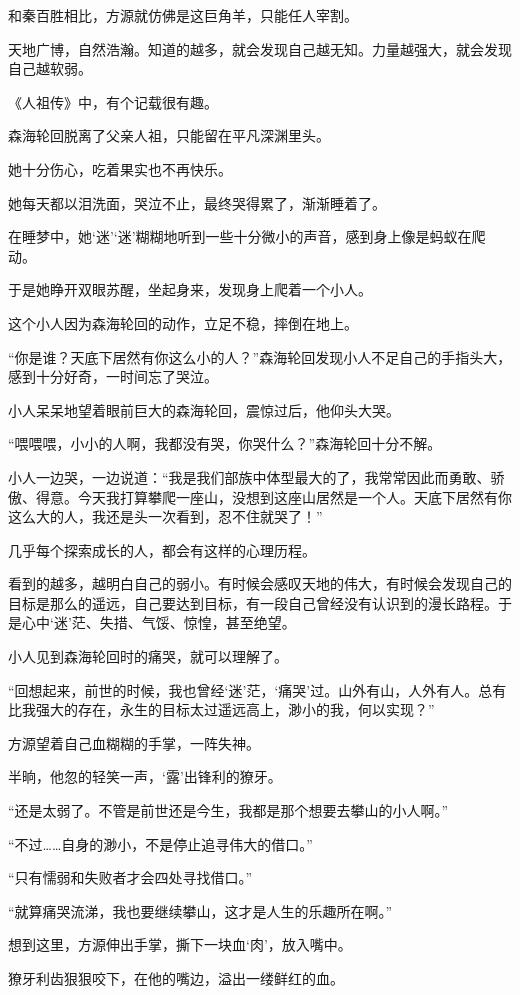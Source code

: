 \begin{this_body}
和秦百胜相比，方源就仿佛是这巨角羊，只能任人宰割。

天地广博，自然浩瀚。知道的越多，就会发现自己越无知。力量越强大，就会发现自己越软弱。

《人祖传》中，有个记载很有趣。

森海轮回脱离了父亲人祖，只能留在平凡深渊里头。

她十分伤心，吃着果实也不再快乐。

她每天都以泪洗面，哭泣不止，最终哭得累了，渐渐睡着了。

在睡梦中，她‘迷’‘迷’糊糊地听到一些十分微小的声音，感到身上像是蚂蚁在爬动。

于是她睁开双眼苏醒，坐起身来，发现身上爬着一个小人。

这个小人因为森海轮回的动作，立足不稳，摔倒在地上。

“你是谁？天底下居然有你这么小的人？”森海轮回发现小人不足自己的手指头大，感到十分好奇，一时间忘了哭泣。

小人呆呆地望着眼前巨大的森海轮回，震惊过后，他仰头大哭。

“喂喂喂，小小的人啊，我都没有哭，你哭什么？”森海轮回十分不解。

小人一边哭，一边说道：“我是我们部族中体型最大的了，我常常因此而勇敢、骄傲、得意。今天我打算攀爬一座山，没想到这座山居然是一个人。天底下居然有你这么大的人，我还是头一次看到，忍不住就哭了！”

几乎每个探索成长的人，都会有这样的心理历程。

看到的越多，越明白自己的弱小。有时候会感叹天地的伟大，有时候会发现自己的目标是那么的遥远，自己要达到目标，有一段自己曾经没有认识到的漫长路程。于是心中‘迷’茫、失措、气馁、惊惶，甚至绝望。

小人见到森海轮回时的痛哭，就可以理解了。

“回想起来，前世的时候，我也曾经‘迷’茫，‘痛哭’过。山外有山，人外有人。总有比我强大的存在，永生的目标太过遥远高上，渺小的我，何以实现？”

方源望着自己血糊糊的手掌，一阵失神。

半晌，他忽的轻笑一声，‘露’出锋利的獠牙。

“还是太弱了。不管是前世还是今生，我都是那个想要去攀山的小人啊。”

“不过……自身的渺小，不是停止追寻伟大的借口。”

“只有懦弱和失败者才会四处寻找借口。”

“就算痛哭流涕，我也要继续攀山，这才是人生的乐趣所在啊。”

想到这里，方源伸出手掌，撕下一块血‘肉’，放入嘴中。

獠牙利齿狠狠咬下，在他的嘴边，溢出一缕鲜红的血。

\end{this_body}


